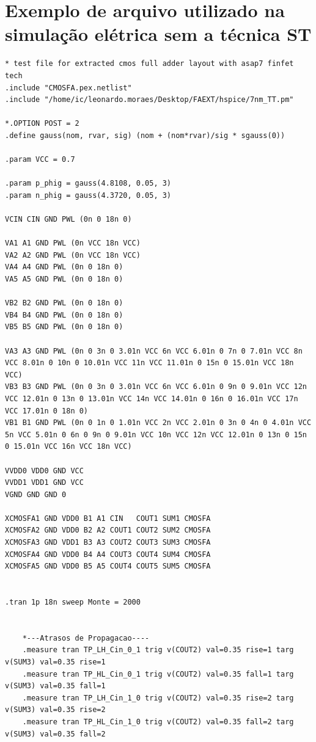 \documentclass[ecp,tc, english]{iiufrgs}
\begin{document}


\annex
\chapter{Exemplo de arquivo utilizado na simulação elétrica sem a técnica ST}

\begin{lstlisting}
* test file for extracted cmos full adder layout with asap7 finfet tech
.include "CMOSFA.pex.netlist"
.include "/home/ic/leonardo.moraes/Desktop/FAEXT/hspice/7nm_TT.pm"

*.OPTION POST = 2
.define gauss(nom, rvar, sig) (nom + (nom*rvar)/sig * sgauss(0))

.param VCC = 0.7

.param p_phig = gauss(4.8108, 0.05, 3)
.param n_phig = gauss(4.3720, 0.05, 3)

VCIN CIN GND PWL (0n 0 18n 0)

VA1 A1 GND PWL (0n VCC 18n VCC)
VA2 A2 GND PWL (0n VCC 18n VCC)
VA4 A4 GND PWL (0n 0 18n 0)
VA5 A5 GND PWL (0n 0 18n 0)

VB2 B2 GND PWL (0n 0 18n 0)
VB4 B4 GND PWL (0n 0 18n 0)
VB5 B5 GND PWL (0n 0 18n 0)

VA3 A3 GND PWL (0n 0 3n 0 3.01n VCC 6n VCC 6.01n 0 7n 0 7.01n VCC 8n VCC 8.01n 0 10n 0 10.01n VCC 11n VCC 11.01n 0 15n 0 15.01n VCC 18n VCC)
VB3 B3 GND PWL (0n 0 3n 0 3.01n VCC 6n VCC 6.01n 0 9n 0 9.01n VCC 12n VCC 12.01n 0 13n 0 13.01n VCC 14n VCC 14.01n 0 16n 0 16.01n VCC 17n VCC 17.01n 0 18n 0)
VB1 B1 GND PWL (0n 0 1n 0 1.01n VCC 2n VCC 2.01n 0 3n 0 4n 0 4.01n VCC 5n VCC 5.01n 0 6n 0 9n 0 9.01n VCC 10n VCC 12n VCC 12.01n 0 13n 0 15n 0 15.01n VCC 16n VCC 18n VCC)

VVDD0 VDD0 GND VCC
VVDD1 VDD1 GND VCC
VGND GND GND 0

XCMOSFA1 GND VDD0 B1 A1 CIN   COUT1 SUM1 CMOSFA
XCMOSFA2 GND VDD0 B2 A2 COUT1 COUT2 SUM2 CMOSFA
XCMOSFA3 GND VDD1 B3 A3 COUT2 COUT3 SUM3 CMOSFA
XCMOSFA4 GND VDD0 B4 A4 COUT3 COUT4 SUM4 CMOSFA
XCMOSFA5 GND VDD0 B5 A5 COUT4 COUT5 SUM5 CMOSFA


.tran 1p 18n sweep Monte = 2000

    
    *---Atrasos de Propagacao----
    .measure tran TP_LH_Cin_0_1 trig v(COUT2) val=0.35 rise=1 targ v(SUM3) val=0.35 rise=1
    .measure tran TP_HL_Cin_0_1 trig v(COUT2) val=0.35 fall=1 targ v(SUM3) val=0.35 fall=1
    .measure tran TP_LH_Cin_1_0 trig v(COUT2) val=0.35 rise=2 targ v(SUM3) val=0.35 rise=2
    .measure tran TP_HL_Cin_1_0 trig v(COUT2) val=0.35 fall=2 targ v(SUM3) val=0.35 fall=2


\end{lstlisting}
\end{document}
